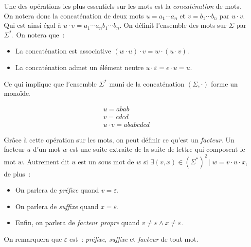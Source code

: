 \begin{definition}
    Une des opérations les plus essentiels sur les mots est la
    \textit{concaténation} de mots. On notera donc la concaténation de deux mots
    \(u = a_1 \cdots a_n\) et \(v = b_1 \cdots b_n\) par \(u \cdot v\). Qui est
    ainsi égal à \(u \cdot v = a_1 \cdots a_n b_1 \cdots b_n\). On définit
    l'ensemble des mots sur \(\Sigma\) par \(\Sigma ^ *\). On notera que~:

    \begin{itemize}[label=\textbullet]
        \item La concaténation est associative \((w \cdot u) \cdot v = w \cdot (u \cdot v)\).
        \item La concaténation admet un élément neutre \(u \cdot \varepsilon = \epsilon \cdot
              u = u\).
    \end{itemize}

    \noindent Ce qui implique que l'ensemble \(\Sigma ^ *\) muni de la concaténation
    \((\Sigma, \cdot)\) forme un monoïde.
\end{definition}

\begin{example}
    \begin{gather*}
        u = abab \\
        v = cdcd \\
        u \cdot v = ababcdcd
    \end{gather*}
\end{example}

\begin{definition}
    Grâce à cette opération sur les mots, on peut définir ce qu'est un
    \textit{facteur}. Un facteur \(u\) d'un mot \(w\) est une suite extraite de la
    suite de lettre qui composent le mot \(w\). Autrement dit \(u\) est un sous mot
    de \(w\) si \(\exists (v, x) \in (\Sigma ^ *)^2 ~|~ w = v \cdot u \cdot x\), de
    plus~:

    \begin{itemize}[label=\textbullet]
        \item On parlera de \textit{préfixe} quand \(v = \varepsilon\).
        \item On parlera de \textit{suffixe} quand \(x = \varepsilon\).
        \item Enfin, on parlera de \textit{facteur propre} quand \(v \neq \varepsilon \land x
              \neq \varepsilon\).
    \end{itemize}

    \noindent On remarquera que \(\varepsilon\) est~: \textit{préfixe}, \textit{suffixe} et
    \textit{facteur} de tout mot.
\end{definition}

